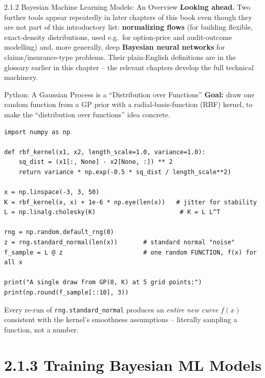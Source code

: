\documentclass[aspectratio=169,10pt]{beamer}
\begin{document}
\begin{frame}[allowframebreaks]{2.1.2 Bayesian Machine Learning Models: An Overview}
  \textbf{Looking ahead.} Two further tools appear repeatedly in later
  chapters of this book even though they are not part of this introductory
  list: \textbf{normalizing flows} (for building flexible, exact-density
  distributions, used e.g.\ for option-price and audit-outcome modelling)
  and, more generally, deep \textbf{Bayesian neural networks} for
  claims/insurance-type problems. Their plain-English definitions are in
  the glossary earlier in this chapter -- the relevant chapters develop the
  full technical machinery.
\end{frame}

\begin{frame}[fragile]{Python: A Gaussian Process is a ``Distribution over Functions''}
  \textbf{Goal:} draw one random function from a GP prior with a
  radial-basis-function (RBF) kernel, to make the ``distribution over
  functions'' idea concrete.
  \begin{lstlisting}
import numpy as np

def rbf_kernel(x1, x2, length_scale=1.0, variance=1.0):
    sq_dist = (x1[:, None] - x2[None, :]) ** 2
    return variance * np.exp(-0.5 * sq_dist / length_scale**2)

x = np.linspace(-3, 3, 50)
K = rbf_kernel(x, x) + 1e-6 * np.eye(len(x))   # jitter for stability
L = np.linalg.cholesky(K)                       # K = L L^T

rng = np.random.default_rng(0)
z = rng.standard_normal(len(x))       # standard normal "noise"
f_sample = L @ z                      # one random FUNCTION, f(x) for all x

print("A single draw from GP(0, K) at 5 grid points:")
print(np.round(f_sample[::10], 3))
  \end{lstlisting}
  Every re-run of \texttt{rng.standard\_normal} produces an \emph{entire new
  curve} $f(x)$ consistent with the kernel's smoothness assumptions --
  literally sampling a function, not a number.
\end{frame}

\section{2.1.3 Training Bayesian ML Models}
\end{document}
